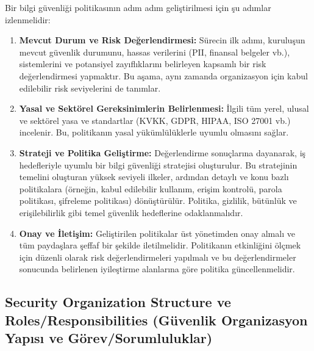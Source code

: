 Bir bilgi güvenliği politikasının adım adım geliştirilmesi için şu adımlar izlenmelidir:
\begin{enumerate}
    \item \textbf{Mevcut Durum ve Risk Değerlendirmesi:} Sürecin ilk adımı, kuruluşun mevcut güvenlik durumunu, hassas verilerini (PII, finansal belgeler vb.), sistemlerini ve potansiyel zayıflıklarını belirleyen kapsamlı bir risk değerlendirmesi yapmaktır. Bu aşama, aynı zamanda organizasyon için kabul edilebilir risk seviyelerini de tanımlar.
    \item \textbf{Yasal ve Sektörel Gereksinimlerin Belirlenmesi:} İlgili tüm yerel, ulusal ve sektörel yasa ve standartlar (KVKK, GDPR, HIPAA, ISO 27001 vb.) incelenir. Bu, politikanın yasal yükümlülüklerle uyumlu olmasını sağlar.
    \item \textbf{Strateji ve Politika Geliştirme:} Değerlendirme sonuçlarına dayanarak, iş hedefleriyle uyumlu bir bilgi güvenliği stratejisi oluşturulur. Bu stratejinin temelini oluşturan yüksek seviyeli ilkeler, ardından detaylı ve konu bazlı politikalara (örneğin, kabul edilebilir kullanım, erişim kontrolü, parola politikası, şifreleme politikası) dönüştürülür. Politika, gizlilik, bütünlük ve erişilebilirlik gibi temel güvenlik hedeflerine odaklanmalıdır.
    \item \textbf{Onay ve İletişim:} Geliştirilen politikalar üst yönetimden onay almalı ve tüm paydaşlara şeffaf bir şekilde iletilmelidir. Politikanın etkinliğini ölçmek için düzenli olarak risk değerlendirmeleri yapılmalı ve bu değerlendirmeler sonucunda belirlenen iyileştirme alanlarına göre politika güncellenmelidir.
\end{enumerate}

\subsection{Security Organization Structure ve Roles/Responsibilities (Güvenlik Organizasyon Yapısı ve Görev/Sorumluluklar)}

